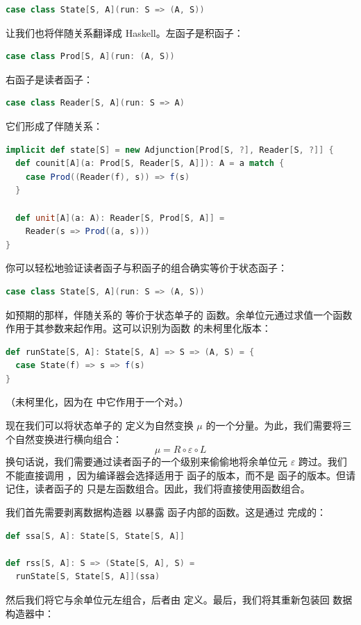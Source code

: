 \begin{lstlisting}[language=Scala]
case class State[S, A](run: S => (A, S))
\end{lstlisting}
让我们也将伴随关系翻译成 Haskell。左函子是积函子：

\begin{lstlisting}[language=Scala]
case class Prod[S, A](run: (A, S))
\end{lstlisting}
右函子是读者函子：

\begin{lstlisting}[language=Scala]
case class Reader[S, A](run: S => A)
\end{lstlisting}
它们形成了伴随关系：

\begin{lstlisting}[language=Scala]
implicit def state[S] = new Adjunction[Prod[S, ?], Reader[S, ?]] {
  def counit[A](a: Prod[S, Reader[S, A]]): A = a match {
    case Prod((Reader(f), s)) => f(s)
  }

  def unit[A](a: A): Reader[S, Prod[S, A]] =
    Reader(s => Prod((a, s)))
}
\end{lstlisting}
你可以轻松地验证读者函子与积函子的组合确实等价于状态函子：

\begin{lstlisting}[language=Scala]
case class State[S, A](run: S => (A, S))
\end{lstlisting}
如预期的那样，伴随关系的  等价于状态单子的  函数。余单位元通过求值一个函数作用于其参数来起作用。这可以识别为函数  的未柯里化版本：

\begin{lstlisting}[language=Scala]
def runState[S, A]: State[S, A] => S => (A, S) = {
  case State(f) => s => f(s)
}
\end{lstlisting}
（未柯里化，因为在  中它作用于一个对。）

现在我们可以将状态单子的  定义为自然变换 $\mu$ 的一个分量。为此，我们需要将三个自然变换进行横向组合：
\[\mu = R \circ \varepsilon \circ L\]
换句话说，我们需要通过读者函子的一个级别来偷偷地将余单位元 $\varepsilon$ 跨过。我们不能直接调用 ，因为编译器会选择适用于  函子的版本，而不是  函子的版本。但请记住，读者函子的  只是左函数组合。因此，我们将直接使用函数组合。

我们首先需要剥离数据构造器  以暴露  函子内部的函数。这是通过  完成的：

\begin{lstlisting}[language=Scala]
def ssa[S, A]: State[S, State[S, A]]

def rss[S, A]: S => (State[S, A], S) =
  runState[S, State[S, A]](ssa)
\end{lstlisting}
然后我们将它与余单位元左组合，后者由  定义。最后，我们将其重新包装回  数据构造器中：


